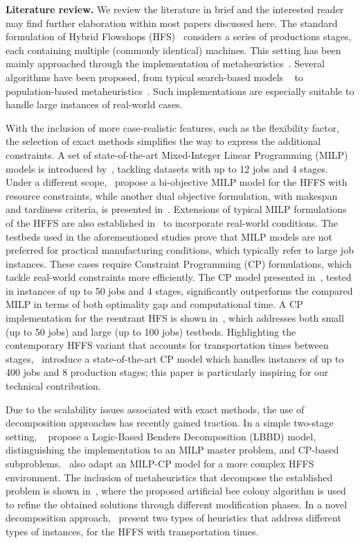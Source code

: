 \documentclass[a4paper,final]{article}
\begin{document}
\textbf{Literature review. } We review the literature in brief and the interested reader may find further elaboration within most papers discussed here. The standard formulation of Hybrid Flowshops (HFS)~\cite{linn1999hybrid} considers a series of productions stages, each containing multiple (commonly identical) machines. This setting has been mainly approached through the implementation of metaheuristics~\cite{choong2011metaheuristic}. Several algorithms have been proposed, from typical search-based models ~\cite{wang2009tabu, mirsanei2011simulated} to population-based metaheuristics~\cite{ruiz2006genetic, %
}. Such implementations are especially suitable to handle large instances of real-world cases.

With the inclusion of more case-realistic features, such as the flexibility factor, the selection of exact methods simplifies the way to express the additional constraints. A set of state-of-the-art Mixed-Integer Linear Programming (MILP) models is introduced by~\cite{naderi2014hybrid}, tackling datasets with up to 12 jobs and 4 stages. Under a different scope,~\cite{mollaei2019bi} propose a bi-objective MILP model for the HFFS with resource constraints, while another dual objective formulation, with makespan and tardiness criteria, is presented in~\cite{jungwattanakit2009comparison}. Extensions of typical MILP formulations of the HFFS are also established in~\cite{meng2020more} to incorporate real-world conditions. The testbeds used in the aforementioned studies prove that MILP models are not preferred for practical manufacturing conditions, which typically refer to large job instances. These cases require Constraint Programming (CP) formulations, which tackle real-world constraints more efficiently. The CP model presented in~\cite{icsik2023constraint}, tested in instances of up to 50 jobs and 4 stages, significantly outperforms the compared MILP in terms of both optimality gap and computational time. A CP implementation for the reentrant HFS is shown in~\cite{mlekusch2025dual}, which addresses both small (up to 50 jobs) and large (up to 100 jobs) testbeds. Highlighting the contemporary HFFS variant that accounts for transportation times between stages,~\cite{armstrong2021hybrid} introduce a state-of-the-art CP model which handles instances of up to 400 jobs and 8 production stages; this paper is particularly inspiring for our technical contribution.

Due to the scalability issues associated with exact methods, the use of decomposition approaches has recently gained traction. In a simple two-stage setting, ~\cite{tan2018logic} propose a Logic-Based Benders Decomposition (LBBD) model, distinguishing the implementation to an MILP master problem, and CP-based subproblems.~\cite{jiang2023decomposition} also adapt an MILP-CP model for a more complex HFFS environment. The inclusion of metaheuristics that decompose the established problem is shown in~\cite{wang2024decomposition}, where the proposed artificial bee colony algorithm is used to refine the obtained solutions through different modification phases. In a novel decomposition approach,~\cite{garraffa2025} present two types of heuristics that address different types of instances, for the HFFS with transportation times.
\end{document}
